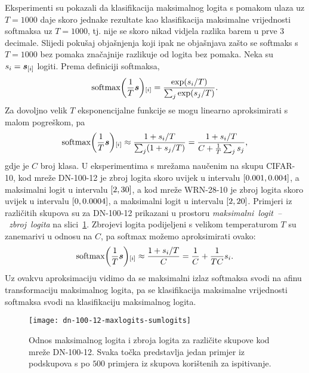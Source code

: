 \documentclass[utf8, diplomski, lmodern]{fer}
\begin{document}
Eksperimenti su pokazali da klasifikacija maksimalnog logita s pomakom ulaza uz $T=1000$ daje skoro jednake rezultate kao klasifikacija maksimalne vrijednosti softmaksa uz $T=1000$, tj. nije se skoro nikad vidjela razlika barem u prve $3$ decimale. Slijedi pokušaj objašnjenja koji ipak ne objašnjava zašto se softmaks s $T=1000$ bez pomaka značajnije razlikuje od logita bez pomaka. Neka su $s_i=\vec s_\ind{i}$ logiti. Prema definiciji softmaksa,
\begin{align}
\softmax\del{\frac{1}{T}\vec s}_\ind{i} = \frac{\exp(s_i/T)}{\sum_j \exp(s_j/T)} \text{.}
\end{align}
Za dovoljno velik $T$ eksponencijalne funkcije se mogu linearno aproksimirati s malom pogreškom, pa 
\begin{align}
\softmax\del{\frac{1}{T}\vec s}_\ind{i}
\approx \frac{1+s_i/T}{\sum_j (1+s_j/T)}
= \frac{1+s_i/T}{C + \frac{1}{T}\sum_j s_j}
\text{,}
\end{align}
gdje je $C$ broj klasa. U eksperimentima s mrežama naučenim na skupu CIFAR-10, kod mreže DN-100-12 je zbroj logita skoro uvijek u intervalu $\intcc{0.001,0.004}$, a maksimalni logit u intervalu $\intcc{2,30}$, a kod mreže WRN-28-10 je zbroj logita skoro uvijek u intervalu $\intcc{0,0.0004}$, a maksimalni logit u intervalu $\intcc{2,20}$. Primjeri iz različitih skupova su za DN-100-12 prikazani u prostoru \textit{maksimalni~logit~--~zbroj~logita} na slici~\ref{fig:dn-100-12-maxlogits-sumlogits}. Zbrojevi logita podijeljeni s velikom temperaturom $T$ su zanemarivi u odnosu na $C$, pa softmax možemo aproksimirati ovako:
\begin{align}
\softmax\del{\frac{1}{T}\vec s}_\ind{i}
\approx \frac{1+s_i/T}{C}
= \frac{1}{C}+\frac{1}{TC}s_i
\text{.}
\end{align}
Uz ovakvu aproksimaciju vidimo da se maksimalni izlaz softmaksa svodi na afinu transformaciju maksimalnog logita, pa se klasifikacija maksimalne vrijednosti softmaksa svodi na klasifikaciju maksimalnog logita.

\begin{figure}
	\centering
	\texttt{[image: dn-100-12-maxlogits-sumlogits]}
	\caption{Odnos maksimalnog logita i zbroja logita za različite skupove kod mreže DN-100-12. Svaka točka predstavlja jedan primjer iz podskupova s po $500$ primjera iz skupova korištenih za ispitivanje.}
	\label{fig:dn-100-12-maxlogits-sumlogits}
\end{figure}
\end{document}

